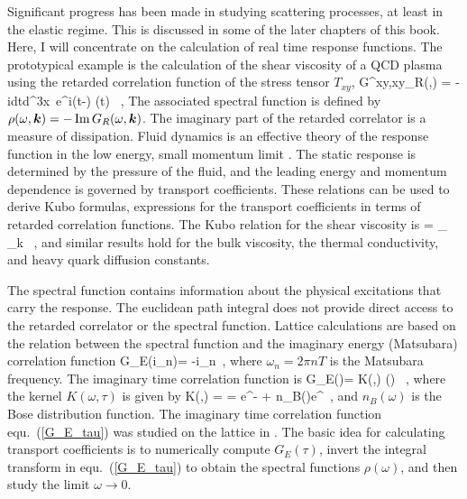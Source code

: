  Significant progress has been made in studying scattering processes,
at least in the elastic regime. This is discussed in some of the later 
chapters of this book. Here, I will concentrate on the calculation
of real time response functions. The prototypical example is the 
calculation of the shear viscosity of a QCD plasma using the retarded 
correlation function of the stress tensor $T_{xy}$, 
\be
\label{G_ret}
G^{xy,xy}_R(\omega,) = -i\int dt\int d^3x\, 
  e^{i(\omega t-\cdot{})} \Theta(t)
  \langle {}\rangle\, , 
\ee
The associated spectral function is defined by $\rho(\omega,\vec{k})
=-\,{\rm Im}\,G_R(\omega,\vec{k})$. The imaginary part of the retarded 
correlator is a measure of dissipation. Fluid dynamics is an effective
theory of the response function in the low energy, small momentum
limit \cite{Schafer:2009dj,Schaefer:2014awa}. The static response is
determined by the pressure of the fluid, and the leading energy and
momentum dependence is governed by transport coefficients. These
relations can be used to derive Kubo formulas, expressions for the 
transport coefficients in terms of retarded correlation functions. 
The Kubo relation for the shear viscosity is 
\be 
\label{eta_kubo}
\eta = \lim_{\omega{}} \lim_{k} 
   \, ,
\ee
and similar results hold for the bulk viscosity, the thermal conductivity, 
and heavy quark diffusion constants. 

 The spectral function contains information about the physical
excitations that carry the response. The euclidean path integral does 
not provide direct access to the retarded correlator or the spectral
function. Lattice calculations are based on the relation between the 
spectral function and the imaginary energy (Matsubara) correlation 
function 
\be 
\label{G_E_w}
G_E(i\omega_n)= \int {} \frac{\rho(\omega)}
 {\omega-i\omega_n}\, , 
\ee
where $\omega_n=2\pi nT$ is the Matsubara frequency. The imaginary
time correlation function is 
\be 
\label{G_E_tau}
G_E(\tau)= \int {} K(\omega,\tau) \rho(\omega) \, , 
\ee
where the kernel $K(\omega,\tau)$ is given by 
\be 
\label{Ker}
K(\omega,\tau) = 
 =   e^{-\omega\tau}
      + n_B(\omega)e^{\omega\tau}\, ,
\ee
and $n_B(\omega)$ is the Bose distribution function. The imaginary time 
correlation function equ.~(\ref{G_E_tau}) was studied on the lattice 
in \cite{Karsch:1986cq,Meyer:2007ic,Meyer:2007dy,Sakai:2007cm}. The 
basic idea for calculating transport coefficients is to numerically 
compute $G_E(\tau)$, invert the integral transform in equ.~(\ref{G_E_tau}) 
to obtain the spectral functions $\rho(\omega)$, and then study the 
limit $\omega\to 0$.

